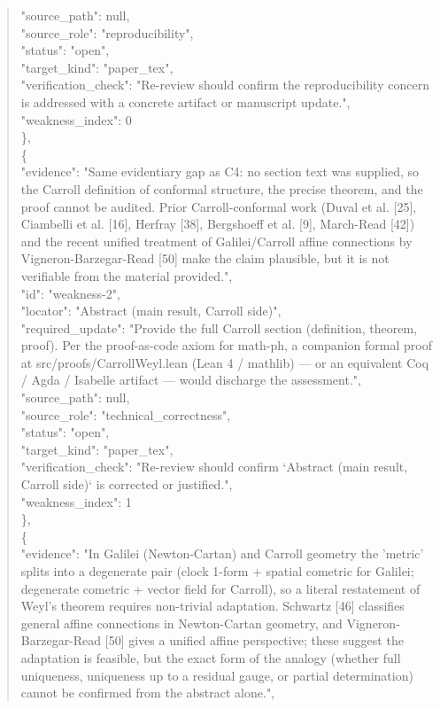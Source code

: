 \documentclass[11pt]{article}
\begin{document}
\begin{quote}
      "source\_path": null,\\
      "source\_role": "reproducibility",\\
      "status": "open",\\
      "target\_kind": "paper\_tex",\\
      "verification\_check": "Re-review should confirm the reproducibility concern is addressed with a concrete artifact or manuscript update.",\\
      "weakness\_index": 0\\
    \},\\
    \{\\
      "evidence": "Same evidentiary gap as C4: no section text was supplied, so the Carroll definition of conformal structure, the precise theorem, and the proof cannot be audited. Prior Carroll-conformal work (Duval et al. [25], Ciambelli et al. [16], Herfray [38], Bergshoeff et al. [9], March-Read [42]) and the recent unified treatment of Galilei/Carroll affine connections by Vigneron-Barzegar-Read [50] make the claim plausible, but it is not verifiable from the material provided.",\\
      "id": "weakness-2",\\
      "locator": "Abstract (main result, Carroll side)",\\
      "required\_update": "Provide the full Carroll section (definition, theorem, proof). Per the proof-as-code axiom for math-ph, a companion formal proof at src/proofs/CarrollWeyl.lean (Lean 4 / mathlib) — or an equivalent Coq / Agda / Isabelle artifact — would discharge the assessment.",\\
      "source\_path": null,\\
      "source\_role": "technical\_correctness",\\
      "status": "open",\\
      "target\_kind": "paper\_tex",\\
      "verification\_check": "Re-review should confirm `Abstract (main result, Carroll side)` is corrected or justified.",\\
      "weakness\_index": 1\\
    \},\\
    \{\\
      "evidence": "In Galilei (Newton-Cartan) and Carroll geometry the 'metric' splits into a degenerate pair (clock 1-form + spatial cometric for Galilei; degenerate cometric + vector field for Carroll), so a literal restatement of Weyl's theorem requires non-trivial adaptation. Schwartz [46] classifies general affine connections in Newton-Cartan geometry, and Vigneron-Barzegar-Read [50] gives a unified affine perspective; these suggest the adaptation is feasible, but the exact form of the analogy (whether full uniqueness, uniqueness up to a residual gauge, or partial determination) cannot be confirmed from the abstract alone.",\\

\end{quote}
\end{document}

